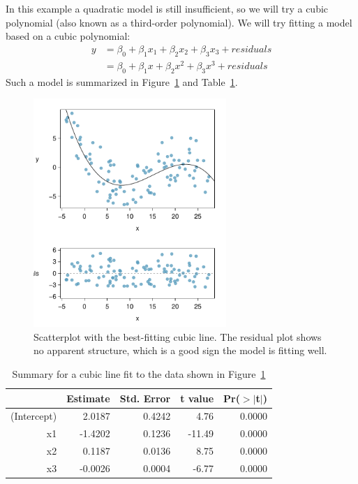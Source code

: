 In this example a quadratic model is still insufficient, so we will try a cubic polynomial (also known as a third-order polynomial). We will try fitting a model based on a cubic polynomial:
\begin{align*}
y &= \beta_0 + \beta_1x_1 + \beta_2x_2 + \beta_3x_3 + residuals \\
	&= \beta_0 + \beta_1x + \beta_2x^2 + \beta_3x^3 + residuals
\end{align*}
Such a model is summarized in Figure~\ref{nonlinear2-4} and Table~\ref{nonlinear2-cubicfitsummary}.
\begin{figure}
\centering
\includegraphics[width=0.65\textwidth]{RegressionExtras/figures/nonlinear/nonlinear2-4}
\caption{Scatterplot with the best-fitting cubic line. The residual plot shows no apparent structure, which is a good sign the model is fitting well.}
\label{nonlinear2-4}
\end{figure}
\begin{table}
\centering
\begin{tabular}{rrrrr}
  \hline
 & Estimate & Std. Error & t value & Pr($>$$|$t$|$) \\ 
  \hline
(Intercept) & 2.0187 & 0.4242 & 4.76 & 0.0000 \\ 
  x1 & -1.4202 & 0.1236 & -11.49 & 0.0000 \\ 
  x2 & 0.1187 & 0.0136 & 8.75 & 0.0000 \\ 
  x3 & -0.0026 & 0.0004 & -6.77 & 0.0000 \\ 
   \hline
\end{tabular}
\caption{Summary for a cubic line fit to the data shown in Figure~\ref{nonlinear2-4}}
\label{nonlinear2-cubicfitsummary}
\end{table}

